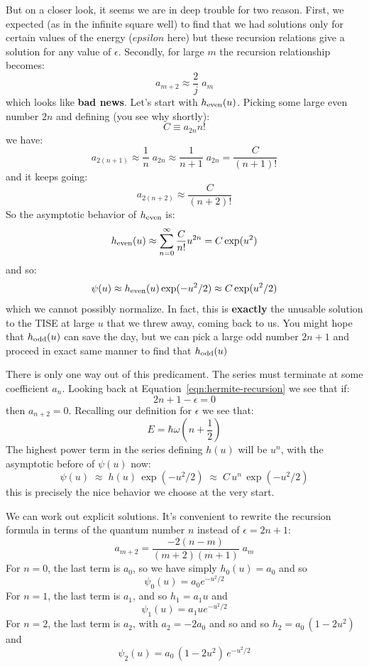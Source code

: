 \documentclass[12pt]{book}
\begin{document}
But on a closer look, it seems we are in deep trouble for two reason.  First, we expected (as in the infinite square well) to find that we had solutions only for certain values of the energy ($epsilon$ here) but these recursion relations give a solution for any value of $\epsilon$.  Secondly, for large $m$ the recursion relationship becomes:
$$a_{m+2} \approx \frac{2}{j}\;a_{m}$$
which looks like {\bf bad news}.  Let's start with $h_{\rm even}(u)$.  Picking some large even number $2n$ and defining (you see why shortly):
$$C \equiv a_{2n} n!$$
we have:
$$a_{2(n+1)} \approx \frac{1}{n}\;a_{2n} \approx \frac{1}{n+1}\;a_{2n} = \frac{C}{(n+1)!}$$
and it keeps going:
$$a_{2(n+2)} \approx \frac{C}{(n+2)!}$$
So the asymptotic behavior of $h_{\rm even}$ is:
$$h_{\rm even}(u) \approx \sum_{n=0}^{\infty} \frac{C}{n!}u^{2n} = C\exp(u^2)$$
and so:
$$\psi(u) \approx h_{\rm even}(u) \exp(-u^2/2) \approx C \exp(u^2/2)$$
which we cannot possibly normalize.  In fact, this is {\bf exactly} the unusable solution to the TISE at large $u$ that we threw away, coming back to us.
You might hope that $h_{\rm odd}(u)$ can save the day, but we can pick a large odd number $2n+1$ and proceed in exact same manner to find that $h_{\rm odd}(u)$

There is only one way out of this predicament.  The series must terminate at some coefficient $a_n$.
Looking back at Equation~\ref{eqn:hermite-recursion} we see that if:
$$2n+1-\epsilon = 0$$
then $a_{n+2} = 0$.  Recalling our definition for $\epsilon$ we see that:
\begin{equation}
E = \hbar \omega \left( n + \frac{1}{2} \right)
\end{equation}
The highest power term in the series defining $h(u)$ will be $u^n$, with the asymptotic before of $\psi(u)$ now:
$$\psi(u) \; \approx \; h(u) \, \exp(-u^2/2) \; \approx \; C \, u^n \, \exp(-u^2/2)$$
this is precisely the nice behavior we choose at the very start.

We can work out explicit solutions.  It's convenient to rewrite the recursion formula in terms of the quantum number $n$ instead of $\epsilon = 2n+1$:
\begin{equation}
a_{m+2} = \frac{-2(n-m)}{(m+2)(m+1)} \; a_m
\end{equation}
For $n=0$, the last term is $a_0$, so we have simply
$h_0(u) = a_0$ and so
$$\psi_0(u) = a_0 e^{-u^2/2}$$
For $n=1$, the last term is $a_1$, and so $h_1=a_1 u$ and
$$\psi_1(u) = a_1 u e^{-u^2/2} $$
For $n=2$, the last term is $a_2$, with $a_2 = -2a_0$ and so
and so $h_2=a_0 \, (1-2u^2)$ and
$$\psi_2(u) =  a_0 \, (1-2u^2) \, e^{-u^2/2} $$
\end{document}
